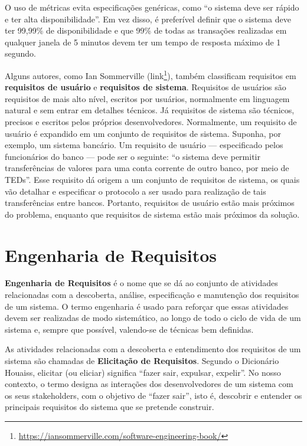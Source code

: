 \documentclass[
  11pt,
  twoside]{book}
\DeclareRobustCommand{\href}[2]{#2\footnote{\url{#1}}}
\begin{document}
O uso de métricas evita especificações genéricas, como ``o sistema deve
ser rápido e ter alta disponibilidade''. Em vez disso, é preferível
definir que o sistema deve ter 99,99\% de disponibilidade e que 99\% de
todas as transações realizadas em qualquer janela de 5 minutos devem ter
um tempo de resposta máximo de 1 segundo.

 Alguns autores, como Ian Sommerville
(\href{https://iansommerville.com/software-engineering-book/}{link}),
também classificam requisitos em \textbf{requisitos de usuário} e
\textbf{requisitos de sistema}. Requisitos de usuários são requisitos de
mais alto nível, escritos por usuários, normalmente em linguagem natural
e sem entrar em detalhes técnicos. Já requisitos de sistema são
técnicos, precisos e escritos pelos próprios desenvolvedores.
Normalmente, um requisito de usuário é expandido em um conjunto de
requisitos de sistema. Suponha, por exemplo, um sistema bancário. Um
requisito de usuário --- especificado pelos funcionários do banco ---
pode ser o seguinte: ``o sistema deve permitir transferências de valores
para uma conta corrente de outro banco, por meio de TEDs''. Esse
requisito dá origem a um conjunto de requisitos de sistema, os quais vão
detalhar e especificar o protocolo a ser usado para realização de tais
transferências entre bancos. Portanto, requisitos de usuário estão mais
próximos do problema, enquanto que requisitos de sistema estão mais
próximos da solução.

\hypertarget{engenharia-de-requisitos-1}{%
\section{Engenharia de Requisitos}\label{engenharia-de-requisitos-1}}

 \textbf{Engenharia de
Requisitos} é o nome que se dá ao conjunto de atividades relacionadas
com a descoberta, análise, especificação e manutenção dos requisitos de
um sistema. O termo engenharia é usado para reforçar que essas
atividades devem ser realizadas de modo sistemático, ao longo de todo o
ciclo de vida de um sistema e, sempre que possível, valendo-se de
técnicas bem definidas.

 As atividades relacionadas com a
descoberta e entendimento dos requisitos de um sistema são chamadas de
\textbf{Elicitação de Requisitos}. Segundo o Dicionário Houaiss,
elicitar (ou eliciar) significa ``fazer sair, expulsar, expelir''. No
nosso contexto, o termo designa as interações dos desenvolvedores de um
sistema com os seus stakeholders, com o objetivo de ``fazer sair'', isto
é, descobrir e entender os principais requisitos do sistema que se
pretende construir.
\end{document}
